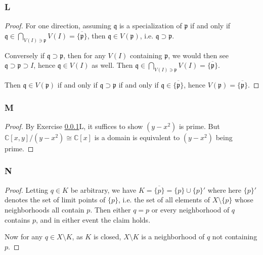\documentclass{article}
\newcommand{\C}{\mathbb{C}}
\newcommand{\frkp}{\mathfrak{p}}
\newcommand{\frkq}{\mathfrak{q}}
\theoremstyle{definition} %
\begin{document}
\subsubsection{L}\label{3.6.L}
\begin{proof}
    For one direction, assuming $\frkq$ is a specialization of $\frkp$ if and only if $\frkq \in \bigcap_{V(I) \ni \frkp} V(I)=\overline{\{\frkp\}}$, then $\frkq \in V(\frkp)$, i.e. $\frkq \supset \frkp$.

    Conversely if $\frkq \supset \frkp$, then for any $V(I)$ containing $\frkp$, we would then see $\frkq \supset \frkp \supset I$, hence $\frkq \in V(I)$ as well. Then $\frkq \in \bigcap_{V(I) \ni \frkp} V(I) = \overline{\{\frkp\}}$.

    Then $\frkq \in V(\frkp)$ if and only if $\frkq \supset \frkp$ if and only if $\frkq \in \overline{\{\frkp\}}$, hence $V(\frkp)=\overline{\{\frkp\}}$.
    
\end{proof}
\subsubsection{M}\label{3.6.M}
\begin{proof}
    By Exercise \ref{3.6.L}L, it suffices to show $(y-x^2)$ is prime. But $\C[x,y]/(y-x^2)\cong \C[x]$ is a domain is equivalent to $(y-x^2)$ being prime.
\end{proof}
\subsubsection{N}\label{3.6.N}
\begin{proof}
    Letting $q\in K$ be arbitrary, we have $K=\overline{\{p\}}=\{p\} \cup \{p\}'$ where here $\{p\}'$ denotes the set of limit points of $\{p\}$, i.e. the set of all elements of $X\setminus \{p\}$ whose neighborhoods all contain $p$. Then either $q=p$ or every neighborhood of $q$ contains $p$, and in either event the claim holds.

    Now for any $q\in X\setminus K$, as $K$ is closed, $X\setminus K$ is a neighborhood of $q$ not containing $p$.
\end{proof}
\end{document}
